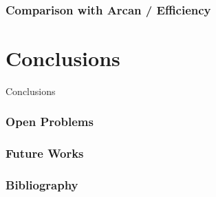 \documentclass[dvipsnames, 10pt, table]{beamer}
\begin{document}
\begin{frame}
  \frametitle{Comparison with Arcan / Efficiency}
\end{frame}

\section{Conclusions}
\begin{frame}
  \centering
  \Huge
  Conclusions
\end{frame}

\begin{frame}
  \frametitle{Open Problems}
\end{frame}

\begin{frame}
  \frametitle{Future Works}
\end{frame}

\begin{frame}
\frametitle{Bibliography}
\printbibliography
\nocite{*}
\end{frame}
\end{document}
